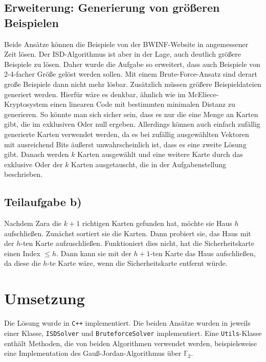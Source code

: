 \documentclass[a4paper,10pt,ngerman]{scrartcl}
\begin{document}
\subsection{Erweiterung: Generierung von größeren Beispielen}
Beide Ansätze können die Beispiele von der BWINF-Website in angemessener Zeit lösen.
Der ISD-Algorithmus ist aber in der Lage, auch deutlich größere Beispiele zu lösen. Daher wurde die Aufgabe so erweitert, dass auch Beispiele von 2-4-facher Größe gelöst werden sollen. Mit einem Brute-Force-Ansatz sind derart große Beispiele dann nicht mehr lösbar. Zusätzlich müssen größere Beispieldateien generiert werden.
Hierfür wäre es denkbar, ähnlich wie im McEliece-Kryptosystem einen linearen Code mit bestimmten minimalen Distanz zu generieren. 
So könnte man sich sicher sein, dass es nur die eine Menge an Karten gibt, die im exklusiven Oder null ergeben. 
Allerdings können auch einfach zufällig generierte Karten verwendet werden, da es bei zufällig ausgewählten Vektoren mit ausreichend Bits äußerst unwahrscheinlich ist, dass es eine zweite Lösung gibt. 
Danach werden $k$ Karten ausgewählt und eine weitere Karte durch das exklusive Oder der $k$ Karten ausgetauscht, die in der Aufgabenstellung beschrieben.

\subsection{Teilaufgabe b)}
Nachdem Zara die $k+1$ richtigen Karten gefunden hat, möchte sie Haus $h$ aufschließen. Zunächst sortiert sie die Karten. Dann probiert sie, das Haus mit der $h$-ten Karte aufzuschließen. Funktioniert dies nicht, hat die Sicherheitskarte einen Index $\leq h$. Dann kann sie mit der $h+1$-ten Karte das Haus aufschließen, da diese die $h$-te Karte wäre, wenn die Sicherheitskarte entfernt würde.
\section{Umsetzung}
Die Lösung wurde in \texttt{C++} implementiert. Die beiden Ansätze wurden in jeweils einer Klasse, \lstinline{ISDSolver} und \lstinline{BruteforceSolver} implementiert. Eine \lstinline{Utils}-Klasse enthält Methoden, die von beiden Algorithmen verwendet werden, beispielsweise eine Implementation des Gauß-Jordan-Algorithmus über $\mathbb{F}_2$.
\end{document}
